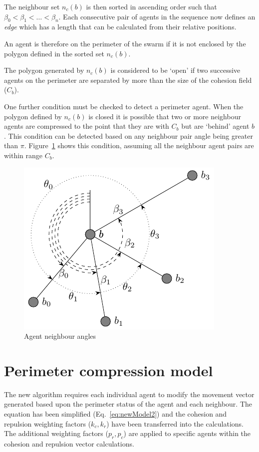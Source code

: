 \documentclass[12pt,a4paper]{IEEEtran}
\begin{document}
The neighbour set $n_c(b)$ is then sorted in ascending order such that $\beta_0 < \beta_1 < \ldots < \beta_n$. Each consecutive pair of agents in the sequence now defines an \textit{edge} which has a length that can be calculated from their relative positions.

An agent is therefore on the perimeter of the swarm if it is not enclosed by the polygon defined in the sorted set $n_c(b)$. 

The polygon generated by $n_c(b)$ is considered to be `open' if two successive agents on the perimeter are separated by more than the size of the cohesion field ($C_b$).  

One further condition must be checked to detect a perimeter agent. When the polygon defined by $n_c(b)$ is closed it is possible that two or more neighbour agents are compressed to the point that they are with $C_b$ but are `behind' agent $b$. This condition can be detected based on any neighbour pair angle being greater than $\pi$. Figure~\ref{fig:neighbours3} shows this condition, assuming all the neighbour agent pairs are within range $C_b$. 

\begin{figure}[H]
	\centering
	\includegraphics[width=0.8\linewidth]{figures/neighbours3}
	\caption[Agent neighbours]{Agent neighbour angles}
	\label{fig:neighbours3}
\end{figure}

\section{Perimeter compression model}
The new algorithm requires each individual agent to modify the movement vector generated based upon the perimeter status of the agent and each neighbour. The equation has been simplified (Eq.~\ref{eq:newModel2}) and the cohesion and repulsion weighting factors ($k_c,k_r$) have been transferred into the calculations. The additional weighting factors ($p_r,p_c$) are applied to specific agents within the cohesion and repulsion vector calculations.
\end{document}
